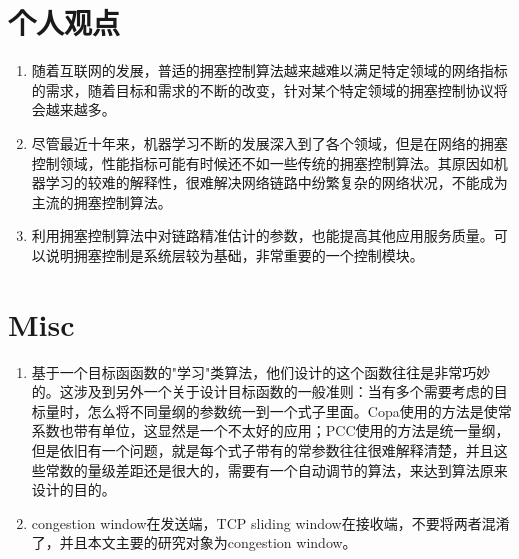 \documentclass[a4paper, 12pt, UTF8]{ctexart}
\begin{document}
\clearpage

\section{个人观点}
\begin{enumerate}
	\item 随着互联网的发展，普适的拥塞控制算法越来越难以满足特定领域的网络指标的需求，随着目标和需求的不断的改变，针对某个特定领域的拥塞控制协议将会越来越多。
	\item 尽管最近十年来，机器学习不断的发展深入到了各个领域，但是在网络的拥塞控制领域，性能指标可能有时候还不如一些传统的拥塞控制算法。其原因如机器学习的较难的解释性，很难解决网络链路中纷繁复杂的网络状况，不能成为主流的拥塞控制算法。
	\item 利用拥塞控制算法中对链路精准估计的参数，也能提高其他应用服务质量。可以说明拥塞控制是系统层较为基础，非常重要的一个控制模块。
\end{enumerate}


\clearpage

\section{Misc}

\begin{enumerate}
	\item 基于一个目标函函数的"学习"类算法，他们设计的这个函数往往是非常巧妙的。这涉及到另外一个关于设计目标函数的一般准则：当有多个需要考虑的目标量时，怎么将不同量纲的参数统一到一个式子里面。Copa使用的方法是使常系数也带有单位，这显然是一个不太好的应用；PCC使用的方法是统一量纲，但是依旧有一个问题，就是每个式子带有的常参数往往很难解释清楚，并且这些常数的量级差距还是很大的，需要有一个自动调节的算法，来达到算法原来设计的目的。
	\item congestion window在发送端，TCP sliding window在接收端，不要将两者混淆了，并且本文主要的研究对象为congestion window。
\end{enumerate}

\clearpage


\end{document}
